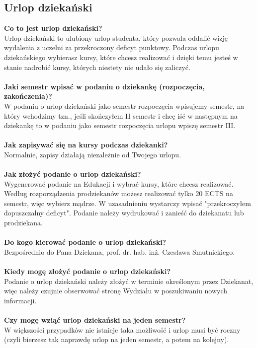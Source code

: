 \documentclass[11pt]{article}
\begin{document}
\subsection{Urlop dziekański}
\textbf{Co to jest urlop dziekański?} \\
\indent Urlop dziekański to ulubiony urlop studenta, który pozwala oddalić wizję wydalenia z uczelni za przekroczony deficyt punktowy. Podczas urlopu dziekańskiego wybierasz kursy, które chcesz realizować i dzięki temu jesteś w stanie nadrobić kursy, których niestety nie udało się zaliczyć. \\\\
\textbf{Jaki semestr wpisać w podaniu o dziekankę (rozpoczęcia, zakończenia)?} \\
\indent W podaniu o urlop dziekański jako semestr rozpoczęcia wpisujemy semestr, na który wchodzimy tzn., jeśli skończyłem II semestr i chcę iść w następnym na dziekankę to w podaniu jako semestr rozpoczęcia urlopu wpiszę semestr III. \\\\
\textbf{Jak zapisywać się na kursy podczas dziekanki?} \\
\indent Normalnie, zapisy działają niezależnie od Twojego urlopu. \\\\
\textbf{Jak złożyć podanie o urlop dziekański?} \\
\indent Wygenerować podanie na Edukacji i wybrać kursy, które chcesz realizować. Według rozporządzenia prodziekanów możesz realizować tylko 20 ECTS na semestr, więc wybierz mądrze. W uzasadnieniu wystarczy wpisać "przekroczyłem dopuszczalny deficyt". Podanie należy wydrukować i zanieść do dziekanatu lub prodziekana. \\\\
\textbf{Do kogo kierować podanie o urlop dziekański?} \\
\indent Bezpośrednio do Pana Dziekana, prof. dr. hab. inż. Czesława Smutnickiego. \\\\
\textbf{Kiedy mogę złożyć podanie o urlop dziekański?} \\
\indent Podanie o urlop dziekański należy złożyć w terminie określonym przez Dziekanat, więc należy czujnie obserwować stronę Wydziału w poszukiwaniu nowych informacji. \\\\
\textbf{Czy mogę wziąć urlop dziekański na jeden semestr?} \\
\indent W większości przypadków nie istnieje taka możliwość i urlop musi być roczny (czyli bierzesz tak naprawdę urlop na jeden semestr, a potem na kolejny). \\\\
\end{document}
